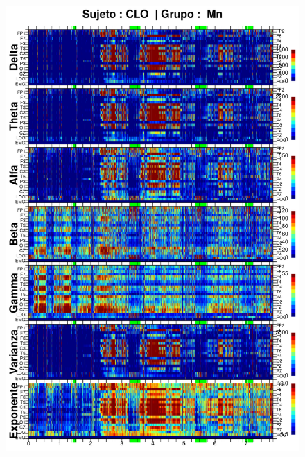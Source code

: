\begin{figure}
\centering
\includegraphics[width=0.9\linewidth]
{./img_resultados/CLMN10SUE_espectral_total.png} 
\end{figure}


